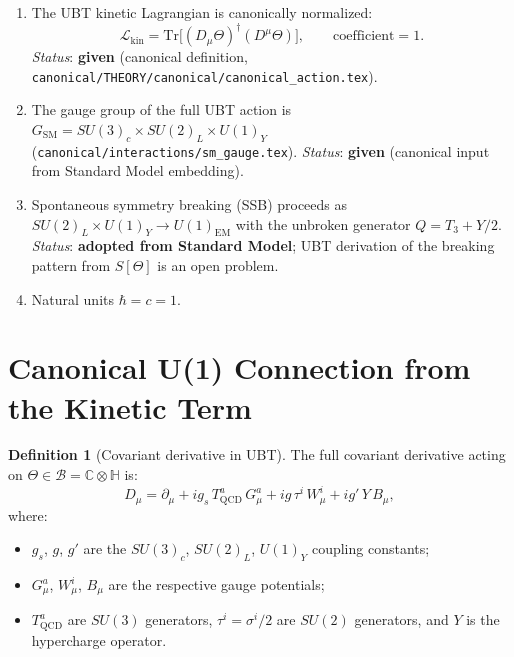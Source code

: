 \documentclass[12pt,a4paper]{article}
\theoremstyle{definition}
\newtheorem{definition}[theorem]{Definition}
\theoremstyle{remark}
\begin{document}
\begin{enumerate}
  \item[\textbf{A1}]
    The UBT kinetic Lagrangian is canonically normalized:
    \begin{equation}
      \mathcal{L}_{\mathrm{kin}} = \mathrm{Tr}\!\bigl[(D_\mu\Theta)^\dagger(D^\mu\Theta)\bigr],
      \qquad \text{coefficient} = 1.
      \label{eq:gn:Lkin}
    \end{equation}
    \textit{Status}: \textbf{given} (canonical definition,
    \texttt{canonical/THEORY/canonical/canonical\_action.tex}).

  \item[\textbf{A2}]
    The gauge group of the full UBT action is
    $G_{\mathrm{SM}} = SU(3)_c \times SU(2)_L \times U(1)_Y$
    (\texttt{canonical/interactions/sm\_gauge.tex}).
    \textit{Status}: \textbf{given} (canonical input from Standard Model embedding).

  \item[\textbf{A3}]
    Spontaneous symmetry breaking (SSB) proceeds as
    $SU(2)_L \times U(1)_Y \to U(1)_{\mathrm{EM}}$
    with the unbroken generator $Q = T_3 + Y/2$.
    \textit{Status}: \textbf{adopted from Standard Model}; UBT derivation of the
    breaking pattern from $S[\Theta]$ is an open problem.

  \item[\textbf{A4}]
    Natural units $\hbar = c = 1$.
\end{enumerate}

\section{Canonical U(1) Connection from the Kinetic Term}
\label{sec:gn:connection}

\begin{definition}[Covariant derivative in UBT]
\label{def:gn:Dmu}
The full covariant derivative acting on $\Theta \in \mathcal{B} = \mathbb{C}\otimes\mathbb{H}$ is:
\begin{equation}
  D_\mu = \partial_\mu
        + i g_s\, T^a_{\mathrm{QCD}}\, G^a_\mu
        + i g\, \tau^i\, W^i_\mu
        + i g'\, Y\, B_\mu,
  \label{eq:gn:Dmu}
\end{equation}
where:
\begin{itemize}
  \item $g_s$, $g$, $g'$ are the $SU(3)_c$, $SU(2)_L$, $U(1)_Y$ coupling constants;
  \item $G^a_\mu$, $W^i_\mu$, $B_\mu$ are the respective gauge potentials;
  \item $T^a_{\mathrm{QCD}}$ are $SU(3)$ generators, $\tau^i = \sigma^i/2$ are $SU(2)$
        generators, and $Y$ is the hypercharge operator.
\end{itemize}
\end{definition}
\end{document}
